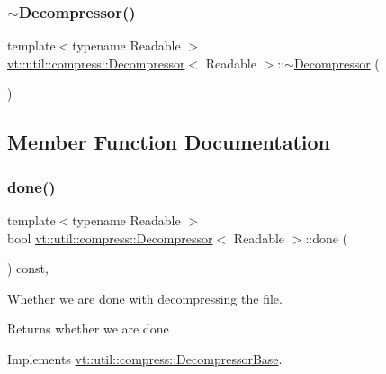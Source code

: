 \subsubsection{\texorpdfstring{$\sim$\+Decompressor()}{~Decompressor()}}
{\footnotesize\ttfamily template$<$typename Readable $>$ \\
\hyperlink{structvt_1_1util_1_1compress_1_1_decompressor}{vt\+::util\+::compress\+::\+Decompressor}$<$ Readable $>$\+::$\sim$\hyperlink{structvt_1_1util_1_1compress_1_1_decompressor}{Decompressor} (\begin{DoxyParamCaption}{ }\end{DoxyParamCaption})\hspace{0.3cm}{\ttfamily [virtual]}}



\subsection{Member Function Documentation}
\mbox{\label{structvt_1_1util_1_1compress_1_1_decompressor_a68ee22d625a76f53fbda4b829863d01d}} 
\subsubsection{\texorpdfstring{done()}{done()}}
{\footnotesize\ttfamily template$<$typename Readable $>$ \\
bool \hyperlink{structvt_1_1util_1_1compress_1_1_decompressor}{vt\+::util\+::compress\+::\+Decompressor}$<$ Readable $>$\+::done (\begin{DoxyParamCaption}{ }\end{DoxyParamCaption}) const\hspace{0.3cm}{\ttfamily [override]}, {\ttfamily [virtual]}}



Whether we are done with decompressing the file. 

\begin{DoxyReturn}{Returns}
whether we are done 
\end{DoxyReturn}


Implements \hyperlink{structvt_1_1util_1_1compress_1_1_decompressor_base_ab9c1b966391fe8e83a1ed30d968b606b}{vt\+::util\+::compress\+::\+Decompressor\+Base}.

